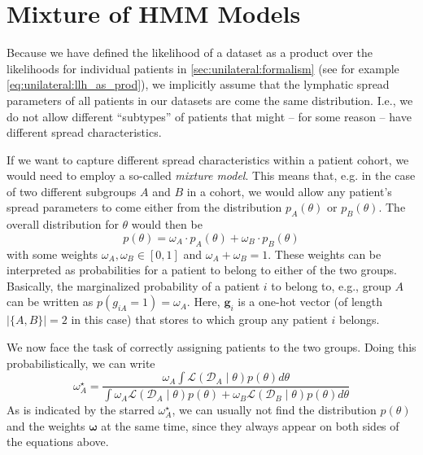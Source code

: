 \documentclass[\relativeRoot/main.tex]{subfiles}
\begin{document}
\section{Mixture of HMM Models}
\label{sec:future:mixture}

Because we have defined the likelihood of a dataset as a product over the likelihoods for individual patients in \cref{sec:unilateral:formalism} (see for example \cref{eq:unilateral:llh_as_prod}), we implicitly assume that the lymphatic spread parameters of all patients in our datasets are come the same distribution. I.e., we do not allow different ``subtypes'' of patients that might -- for some reason -- have different spread characteristics.

If we want to capture different spread characteristics within a patient cohort, we would need to employ a so-called \emph{mixture model}. This means that, e.g. in the case of two different subgroups $A$ and $B$ in a cohort, we would allow any patient's spread parameters to come either from the distribution $p_A\left( \theta \right)$ or $p_B \left( \theta \right)$. The overall distribution for $\theta$ would then be
%
\begin{equation}
    p \left( \theta \right) = \omega_A \cdot p_A\left( \theta \right) + \omega_B \cdot p_B\left( \theta \right)
\end{equation}
%
with some weights $\omega_A, \omega_B \in [0,1]$ and $\omega_A + \omega_B = 1$. These weights can be interpreted as probabilities for a patient to belong to either of the two groups. Basically, the marginalized probability of a patient $i$ to belong to, e.g., group $A$ can be written as $p\left(g_{iA} = 1\right) = \omega_A$. Here, $\mathbf{g}_i$ is a one-hot vector (of length $|\{A,B\}| = 2$ in this case) that stores to which group any patient $i$ belongs.

We now face the task of correctly assigning patients to the two groups. Doing this probabilistically, we can write
%
\begin{equation}
    \omega^\star_A = \frac{\omega_A \int{\mathcal{L}\left( \boldsymbol{\mathcal{D}}_A \mid \theta \right) p\left( \theta \right) d\theta}}{\int{\omega_A \mathcal{L}\left( \boldsymbol{\mathcal{D}}_A \mid \theta \right) p\left( \theta \right) + \omega_B \mathcal{L}\left( \boldsymbol{\mathcal{D}}_B \mid \theta \right) p\left( \theta \right) d\theta}}
\end{equation}
%
As is indicated by the starred $\omega^\star_A$, we can usually not find the distribution $p\left(\theta\right)$ and the weights $\boldsymbol{\omega}$ at the same time, since they always appear on both sides of the equations above.
\end{document}

